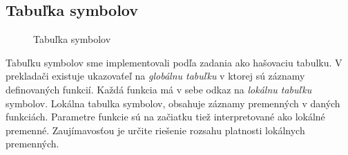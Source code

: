 \documentclass[Slovak, a4paper, 12pt]{article}
\begin{document}
	\subsection{Tabuľka symbolov}
		\begin{figure}
			\caption{Tabuľka symbolov}
		\end{figure}
	Tabuľku symbolov sme implementovali podľa zadania ako hašovaciu tabulku. V prekladači existuje ukazovaťeľ na \textit{globálnu tabuľku} v ktorej sú záznamy definovaných funkcií. Každá funkcia má v sebe odkaz na \textit{lokálnu tabuľku} symbolov.  Lokálna tabulka symbolov, obsahuje záznamy premenných v daných funkciách. Parametre funkcie sú na začiatku tiež interpretované ako lokálné premenné. Zaujímavosťou je určite riešenie rozsahu platnosti lokálnych premenných.
\end{document}
